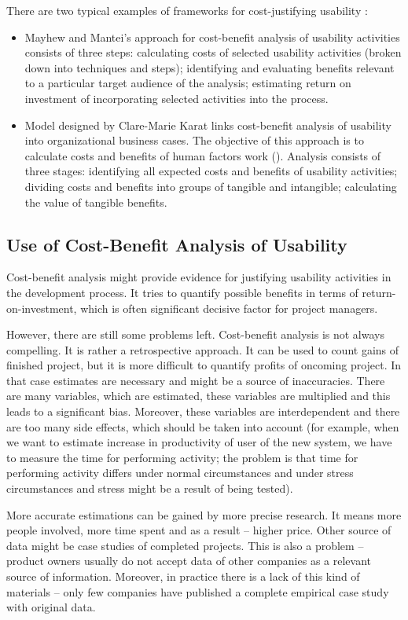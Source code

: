 \documentclass[graybox]{svmult}
\begin{document}
There are two typical examples of frameworks for cost-justifying usability
\cite{rajanen2007usability}:
\begin{itemize}
\item Mayhew and Mantei's approach for cost-benefit analysis of usability
activities consists of three steps: calculating costs of selected usability
activities (broken down into techniques and steps); identifying and
evaluating benefits relevant to a particular target audience of the analysis;
estimating return on investment of incorporating selected activities into the
process.
\item Model designed by Clare-Marie Karat links cost-benefit analysis of
usability into organizational business cases. The objective of this approach
is to calculate costs and benefits of human factors work
(\cite{rajanen2003usability}).
Analysis consists of three stages: identifying all expected costs and benefits
of usability activities; dividing costs and benefits into groups of tangible
and intangible; calculating the value of tangible benefits.
\end{itemize}

\subsection{Use of Cost-Benefit Analysis of Usability}
Cost-benefit analysis might provide evidence for justifying usability
activities in the development process. It tries to quantify possible benefits
in terms of return-on-investment, which is often significant decisive factor
for project managers.

However, there are still some problems left. Cost-benefit analysis is not
always compelling. It is rather a retrospective approach. It can be used to
count gains of finished project, but it is more difficult to quantify profits
of oncoming project. In that case estimates are necessary and might be a
source of inaccuracies. There are many variables, which are estimated, these
variables are multiplied and this leads to a significant bias. Moreover, these
variables are interdependent and there are too many side effects, which should
be taken into account (for example, when we want to estimate increase in
productivity of user of the new system, we have to measure the time for
performing activity; the problem is that time for performing activity differs
under normal circumstances and under stress circumstances and stress might be
a result of being tested).

More accurate estimations can be gained by more precise research. It means
more people involved, more time spent and as a result -- higher price. Other
source of data might be case studies of completed projects. This is also a
problem -- product owners usually do not accept data of other companies as a
relevant source of information. Moreover, in practice there is a lack of this
kind of materials -- only few companies have published a complete empirical
case study with original data.
\end{document}
